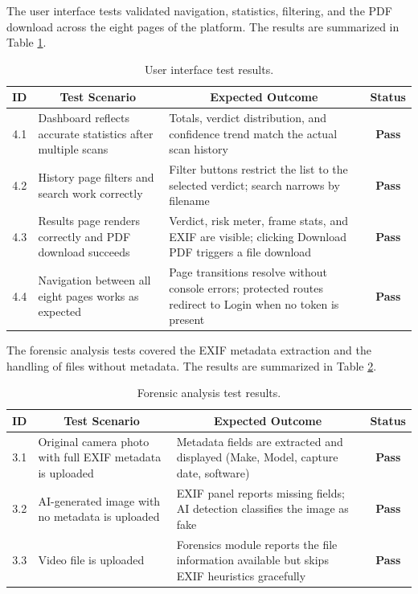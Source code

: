 The user interface tests validated navigation, statistics, filtering, and the PDF download across the eight pages of the platform. The results are summarized in Table \ref{tab:test-ui}.

\begin{table}[H]
\centering
\renewcommand{\arraystretch}{1.3}
\begin{tabular}{|c|p{5.8cm}|p{5.8cm}|c|}
\hline
\textbf{ID} & \multicolumn{1}{c|}{\textbf{Test Scenario}} & \multicolumn{1}{c|}{\textbf{Expected Outcome}} & \textbf{Status} \\
\hline
4.1 & Dashboard reflects accurate statistics after multiple scans & Totals, verdict distribution, and confidence trend match the actual scan history & \textbf{Pass} \\
\hline
4.2 & History page filters and search work correctly & Filter buttons restrict the list to the selected verdict; search narrows by filename & \textbf{Pass} \\
\hline
4.3 & Results page renders correctly and PDF download succeeds & Verdict, risk meter, frame stats, and EXIF are visible; clicking Download PDF triggers a file download & \textbf{Pass} \\
\hline
4.4 & Navigation between all eight pages works as expected & Page transitions resolve without console errors; protected routes redirect to Login when no token is present & \textbf{Pass} \\
\hline
\end{tabular}
\caption{User interface test results.}
\label{tab:test-ui}
\end{table}

The forensic analysis tests covered the EXIF metadata extraction and the handling of files without metadata. The results are summarized in Table \ref{tab:test-forensics}.

\begin{table}[H]
\centering
\renewcommand{\arraystretch}{1.3}
\begin{tabular}{|c|p{5.8cm}|p{5.8cm}|c|}
\hline
\textbf{ID} & \multicolumn{1}{c|}{\textbf{Test Scenario}} & \multicolumn{1}{c|}{\textbf{Expected Outcome}} & \textbf{Status} \\
\hline
3.1 & Original camera photo with full EXIF metadata is uploaded & Metadata fields are extracted and displayed (Make, Model, capture date, software) & \textbf{Pass} \\
\hline
3.2 & AI-generated image with no metadata is uploaded & EXIF panel reports missing fields; AI detection classifies the image as fake & \textbf{Pass} \\
\hline
3.3 & Video file is uploaded & Forensics module reports the file information available but skips EXIF heuristics gracefully & \textbf{Pass} \\
\hline
\end{tabular}
\caption{Forensic analysis test results.}
\label{tab:test-forensics}
\end{table}

